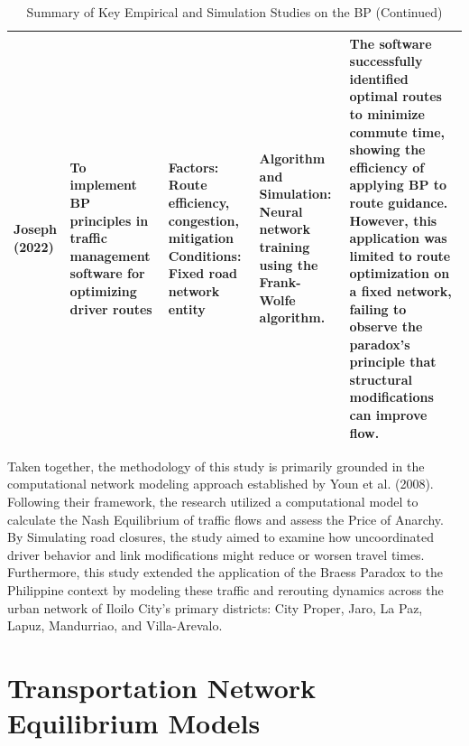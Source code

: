 \begin{landscape}
\begin{table}[p]
    \ContinuedFloat 
    \hspace*{2cm}%
    \begin{minipage}{\dimexpr\linewidth-2cm\relax}
        \vspace{0.25cm}
        \begin{tabularx}{\linewidth}{|p{2.5cm}|X|X|X|X|}
        \hline
        Joseph (2022) & To implement BP principles in traffic management software for optimizing driver routes & Factors: Route efficiency, congestion, mitigation \newline \newline Conditions: Fixed road network entity & Algorithm and Simulation: Neural network training using the Frank-Wolfe algorithm. & The software successfully identified optimal routes to minimize commute time, showing the efficiency of applying BP to route guidance. However, this application was limited to route optimization on a fixed network, failing to observe the paradox's principle that structural modifications can improve flow. \\
        \hline
        \end{tabularx}
                \caption[]{Summary of Key Empirical and Simulation Studies on the BP (Continued)}
    \end{minipage}
\end{table}

\end{landscape}

Taken together, the methodology of this study is primarily grounded in the computational network modeling approach established by Youn et al. (2008). Following their framework, the research utilized a computational model to calculate the Nash Equilibrium of traffic flows and assess the Price of Anarchy. By Simulating road closures, the study aimed to examine how uncoordinated driver behavior and link modifications might reduce or worsen travel times. Furthermore, this study extended the application of the Braess Paradox to the Philippine context by modeling these traffic and rerouting dynamics across the urban network of Iloilo City's primary districts: City Proper, Jaro, La Paz, Lapuz, Mandurriao, and Villa-Arevalo.

\section{Transportation Network Equilibrium Models}
\label{sec:equilibrium_models}

